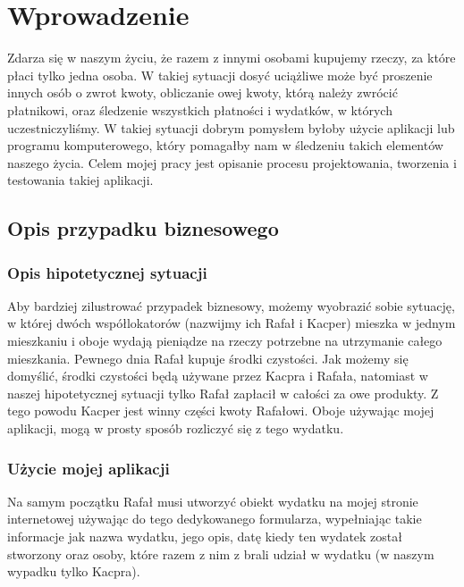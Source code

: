\newpage %
\section{Wprowadzenie}
Zdarza się w naszym życiu, że razem z innymi osobami kupujemy rzeczy, za które płaci tylko jedna osoba. W takiej sytuacji dosyć uciążliwe może być proszenie innych osób o zwrot kwoty, obliczanie owej kwoty, którą należy zwrócić płatnikowi, oraz śledzenie wszystkich płatności i wydatków, w których uczestniczyliśmy. W takiej sytuacji dobrym pomysłem byłoby użycie aplikacji lub programu komputerowego, który pomagałby nam w śledzeniu takich elementów naszego życia. Celem mojej pracy jest opisanie procesu projektowania, tworzenia i testowania takiej aplikacji.

\subsection{Opis przypadku biznesowego}
\subsubsection{Opis hipotetycznej sytuacji}

Aby bardziej zilustrować przypadek biznesowy, możemy wyobrazić sobie sytuację, w której dwóch współlokatorów (nazwijmy ich Rafał i Kacper) mieszka w jednym mieszkaniu i oboje wydają pieniądze na rzeczy potrzebne na utrzymanie całego mieszkania. Pewnego dnia Rafał kupuje środki czystości. Jak możemy się domyślić, środki czystości będą używane przez Kacpra i Rafała, natomiast w naszej hipotetycznej sytuacji tylko Rafał zapłacił w całości za owe produkty. Z tego powodu Kacper jest winny części kwoty Rafałowi. Oboje używając mojej aplikacji, mogą w prosty sposób rozliczyć się z tego wydatku.

\subsubsection{Użycie mojej aplikacji}

Na samym początku Rafał musi utworzyć obiekt wydatku na mojej stronie internetowej używając do tego dedykowanego formularza, wypełniając takie informacje jak nazwa wydatku, jego opis, datę kiedy ten wydatek został stworzony oraz osoby, które razem z nim z brali udział w wydatku (w naszym wypadku tylko Kacpra).

